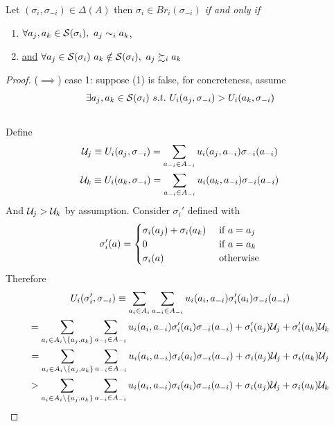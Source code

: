 \documentclass[11pt]{article}
\begin{document}
		\begin{proposition}
			Let $(\sigma_i, \sigma_{-i}) \in \Delta(A)$ then $\sigma_i \in Br_i(\sigma_{-i})$ \emph{if and only if}
			\begin{enumerate}
				\item $\forall a_j, a_k \in \mathcal{{S}}(\sigma_i),\ a_j \sim_i a_k$,
				\item \ul{and} $\forall a_j \in \mathcal{{S}}(\sigma_i)\ a_k \notin \mathcal{{S}}(\sigma_i),\ a_j \succsim_i a_k$
			\end{enumerate}
			\begin{proof}
				($\implies$) case 1: suppose (1) is false, for concreteness, assume
				\begin{equation}
					\exists a_j, a_k \in \mc{S}(\sigma_i)\ s.t.\ U_i(a_j, \sigma_{-i}) > U_i(a_k, \sigma_{-i})
				\end{equation}\\
				Define
				\begin{gather}
					\mathcal{{U}}_j \equiv U_i(a_j, \sigma_{-i}) = \sum_{a_{-i} \in A_{-i}} u_i(a_j, a_{-i}) \sigma_{-i}(a_{-i}) \\
					\mathcal{{U}}_k \equiv U_i(a_k, \sigma_{-i}) = \sum_{a_{-i} \in A_{-i}} u_i(a_k, a_{-i}) \sigma_{-i}(a_{-i})
				\end{gather}
				And $\mathcal{{U}}_j > \mathcal{{U}}_k$ by assumption. Consider $\sigma_i'$ defined with 
				\begin{equation}
					\sigma_i'(a) = 
					\begin{cases}
						\sigma_i(a_j) + \sigma_i(a_k) &\text{{ if }} a = a_j \\
						0 &\text{{ if }} a = a_k \\
						\sigma_i(a) &\text{{ otherwise}}
					\end{cases}
				\end{equation}
				Therefore 
				\begin{gather}
					U_i(\sigma_i', \sigma_{-i}) \equiv \sum_{a_i \in A_i} \sum_{a_{-i} \in A_{-i}} u_i(a_i, a_{-i}) \sigma_i'(a_i) \sigma_{-i}(a_{-i}) \\
					= \sum_{a_i \in A_i\backslash \{a_j, a_k\}} \sum_{a_{-i} \in A_{-i}} u_i(a_i, a_{-i}) \sigma_i'(a_i) \sigma_{-i}(a_{-i}) + \sigma_i'(a_j) \mc{U}_j + \sigma_i'(a_k) \mc{U}_k \\
					= \sum_{a_i \in A_i\backslash \{a_j, a_k\}} \sum_{a_{-i} \in A_{-i}} u_i(a_i, a_{-i}) \sigma_i(a_i) \sigma_{-i}(a_{-i}) + \sigma_i(a_j) \mc{U}_j + \sigma_i(a_k) \mc{U}_j \\
					> \sum_{a_i \in A_i\backslash \{a_j, a_k\}} \sum_{a_{-i} \in A_{-i}} u_i(a_i, a_{-i}) \sigma_i(a_i) \sigma_{-i}(a_{-i}) + \sigma_i(a_j) \mc{U}_j + \sigma_i(a_k) \mc{U}_k \\

\end{gather}
\end{proof}
\end{proposition}
\end{document}
